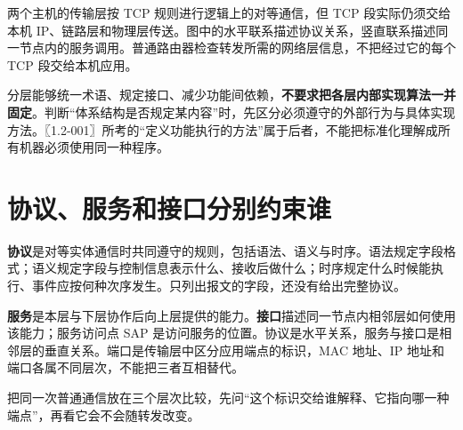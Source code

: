 两个主机的传输层按 TCP 规则进行逻辑上的对等通信，但 TCP 段实际仍须交给本机 IP、链路层和物理层传送。图中的水平联系描述协议关系，竖直联系描述同一节点内的服务调用。普通路由器检查转发所需的网络层信息，不把经过它的每个 TCP 段交给本机应用。

分层能够统一术语、规定接口、减少功能间依赖，\textbf{不要求把各层内部实现算法一并固定}。判断``体系结构是否规定某内容''时，先区分必须遵守的外部行为与具体实现方法。〖1.2-001〗所考的``定义功能执行的方法''属于后者，不能把标准化理解成所有机器必须使用同一种程序。

\section{协议、服务和接口分别约束谁}\label{CN01-05}

\textbf{协议}是对等实体通信时共同遵守的规则，包括语法、语义与时序。语法规定字段格式；语义规定字段与控制信息表示什么、接收后做什么；时序规定什么时候能执行、事件应按何种次序发生。只列出报文的字段，还没有给出完整协议。

\textbf{服务}是本层与下层协作后向上层提供的能力。\textbf{接口}描述同一节点内相邻层如何使用该能力；服务访问点 SAP 是访问服务的位置。协议是水平关系，服务与接口是相邻层的垂直关系。端口是传输层中区分应用端点的标识，MAC 地址、IP 地址和端口各属不同层次，不能把三者互相替代。

把同一次普通通信放在三个层次比较，先问``这个标识交给谁解释、它指向哪一种端点''，再看它会不会随转发改变。

